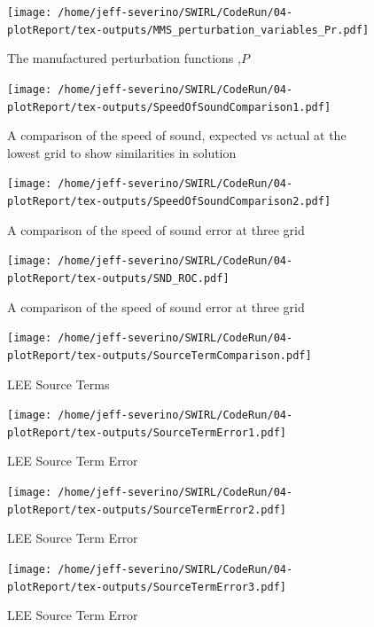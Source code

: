 \begin{figure}[!]
    \centering
    \texttt{[image: /home/jeff-severino/SWIRL/CodeRun/04-plotReport/tex-outputs/MMS\_perturbation\_variables\_Pr.pdf]}
\caption{The manufactured perturbation functions ,$P$}%
    \label{fig:4a}
\end{figure}

\begin{figure}[!]
    \centering
    \texttt{[image: /home/jeff-severino/SWIRL/CodeRun/04-plotReport/tex-outputs/SpeedOfSoundComparison1.pdf]}
    \caption{ A comparison of the speed of sound, expected vs actual at the lowest grid to show similarities in solution}
    \label{fig:5}
\end{figure}


\begin{figure}[!]
    \centering
    \texttt{[image: /home/jeff-severino/SWIRL/CodeRun/04-plotReport/tex-outputs/SpeedOfSoundComparison2.pdf]}
    \caption{ A comparison of the speed of sound error at three grid}
    \label{fig:5a}
\end{figure}


\begin{figure}[!]
    \centering
    \texttt{[image: /home/jeff-severino/SWIRL/CodeRun/04-plotReport/tex-outputs/SND\_ROC.pdf]}
    \caption{ A comparison of the speed of sound error at three grid}
    \label{fig:5a}
\end{figure}



\begin{figure}[!]
    \centering
    \texttt{[image: /home/jeff-severino/SWIRL/CodeRun/04-plotReport/tex-outputs/SourceTermComparison.pdf]}
    \caption{LEE Source Terms}
    \label{fig:6}
\end{figure}


\begin{figure}[!]
    \centering
    \texttt{[image: /home/jeff-severino/SWIRL/CodeRun/04-plotReport/tex-outputs/SourceTermError1.pdf]}
    \caption{LEE Source Term Error}
    \label{fig:7}
\end{figure}


\begin{figure}[!]
    \centering
    \texttt{[image: /home/jeff-severino/SWIRL/CodeRun/04-plotReport/tex-outputs/SourceTermError2.pdf]}
    \caption{LEE Source Term Error}
    \label{fig:7}
\end{figure}


\begin{figure}[!]
    \centering
    \texttt{[image: /home/jeff-severino/SWIRL/CodeRun/04-plotReport/tex-outputs/SourceTermError3.pdf]}
    \caption{LEE Source Term Error}
    \label{fig:7}
\end{figure}


